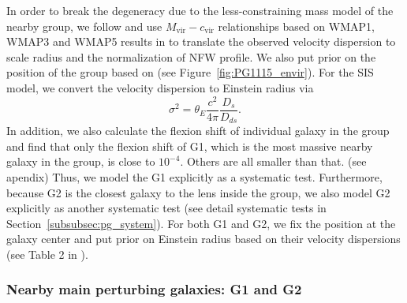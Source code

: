 \documentclass[useAMS,usenatbib]{mnras}
\newcommand{\sref}[1]{Section~\ref{#1}}
\newcommand{\fref}[1]{Figure~\ref{#1}}
\begin{document}
In order to break the degeneracy due to the less-constraining mass model of the nearby group, 
we follow \citet{WongEtal11} and use $M_{\textrm{vir}}-c_{\textrm{vir}}$ relationships based on WMAP1, WMAP3 and WMAP5 results in \citet{MacciEtal08} to translate the observed velocity dispersion to scale radius and the normalization of NFW profile. We also put prior on the position of the group based on \citet{WilsonEtal16} (see \fref{fig:PG1115_envir}).
For the SIS model, we convert the velocity dispersion to Einstein radius via
\begin{equation}
\label{eq:SISVDtoEr}
\sigma^{2}=\theta_{E}\frac{c^{2}}{4\pi}\frac{D_{s}}{D_{ds}}.
\end{equation}
In addition, we also calculate the flexion shift of individual galaxy in the group and find that only the flexion shift of G1, which is the most massive nearby galaxy in the group, is close to $10^{-4}$. Others are all smaller than that. (see apendix)
Thus, we model the G1 explicitly as a systematic test. Furthermore, because G2 is the closest galaxy to the lens inside the group, we also model G2 explicitly as another systematic test (see detail systematic tests in \sref{subsubsec:pg_system}). For both G1 and G2, we fix the position at the galaxy center and put prior on Einstein radius based on their velocity dispersions (see Table 2 in \citet{Tonry98}).

\subsubsection{Nearby main perturbing galaxies: G1 and G2}
\end{document}
